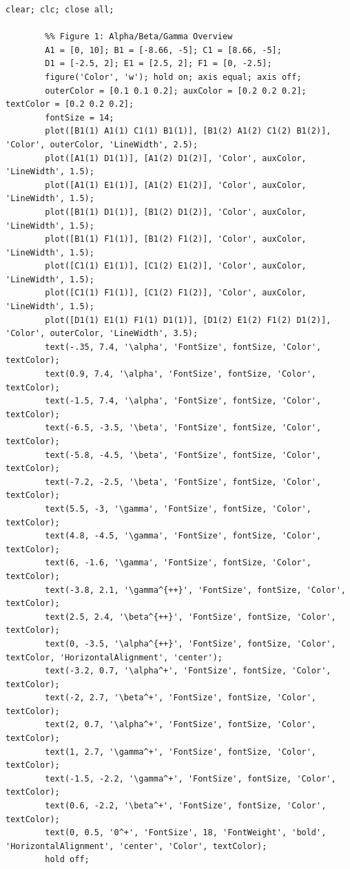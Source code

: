 \documentclass{amsart}
\begin{document}
	\begin{lstlisting}[caption={Geometric simulation and plotting script}]
		clear; clc; close all;
		
		%% Figure 1: Alpha/Beta/Gamma Overview
		A1 = [0, 10]; B1 = [-8.66, -5]; C1 = [8.66, -5];     
		D1 = [-2.5, 2]; E1 = [2.5, 2]; F1 = [0, -2.5];      
		figure('Color', 'w'); hold on; axis equal; axis off;
		outerColor = [0.1 0.1 0.2]; auxColor = [0.2 0.2 0.2]; textColor = [0.2 0.2 0.2];
		fontSize = 14;
		plot([B1(1) A1(1) C1(1) B1(1)], [B1(2) A1(2) C1(2) B1(2)], 'Color', outerColor, 'LineWidth', 2.5);
		plot([A1(1) D1(1)], [A1(2) D1(2)], 'Color', auxColor, 'LineWidth', 1.5);
		plot([A1(1) E1(1)], [A1(2) E1(2)], 'Color', auxColor, 'LineWidth', 1.5);
		plot([B1(1) D1(1)], [B1(2) D1(2)], 'Color', auxColor, 'LineWidth', 1.5);
		plot([B1(1) F1(1)], [B1(2) F1(2)], 'Color', auxColor, 'LineWidth', 1.5);
		plot([C1(1) E1(1)], [C1(2) E1(2)], 'Color', auxColor, 'LineWidth', 1.5);
		plot([C1(1) F1(1)], [C1(2) F1(2)], 'Color', auxColor, 'LineWidth', 1.5);
		plot([D1(1) E1(1) F1(1) D1(1)], [D1(2) E1(2) F1(2) D1(2)], 'Color', outerColor, 'LineWidth', 3.5);
		text(-.35, 7.4, '\alpha', 'FontSize', fontSize, 'Color', textColor);
		text(0.9, 7.4, '\alpha', 'FontSize', fontSize, 'Color', textColor);
		text(-1.5, 7.4, '\alpha', 'FontSize', fontSize, 'Color', textColor);
		text(-6.5, -3.5, '\beta', 'FontSize', fontSize, 'Color', textColor);
		text(-5.8, -4.5, '\beta', 'FontSize', fontSize, 'Color', textColor);
		text(-7.2, -2.5, '\beta', 'FontSize', fontSize, 'Color', textColor);
		text(5.5, -3, '\gamma', 'FontSize', fontSize, 'Color', textColor);
		text(4.8, -4.5, '\gamma', 'FontSize', fontSize, 'Color', textColor);
		text(6, -1.6, '\gamma', 'FontSize', fontSize, 'Color', textColor);
		text(-3.8, 2.1, '\gamma^{++}', 'FontSize', fontSize, 'Color', textColor);
		text(2.5, 2.4, '\beta^{++}', 'FontSize', fontSize, 'Color', textColor);
		text(0, -3.5, '\alpha^{++}', 'FontSize', fontSize, 'Color', textColor, 'HorizontalAlignment', 'center');
		text(-3.2, 0.7, '\alpha^+', 'FontSize', fontSize, 'Color', textColor);
		text(-2, 2.7, '\beta^+', 'FontSize', fontSize, 'Color', textColor);
		text(2, 0.7, '\alpha^+', 'FontSize', fontSize, 'Color', textColor);
		text(1, 2.7, '\gamma^+', 'FontSize', fontSize, 'Color', textColor);
		text(-1.5, -2.2, '\gamma^+', 'FontSize', fontSize, 'Color', textColor);
		text(0.6, -2.2, '\beta^+', 'FontSize', fontSize, 'Color', textColor);
		text(0, 0.5, '0^+', 'FontSize', 18, 'FontWeight', 'bold', 'HorizontalAlignment', 'center', 'Color', textColor);
		hold off;
		

\end{lstlisting}
\end{document}
